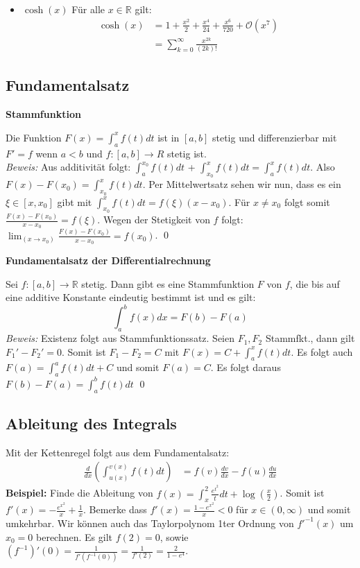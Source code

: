 \documentclass[25pt]{sciposter}
\newcommand{\R}{\mathbb{R}}
\newenvironment{method}[1]{\begin{mdframed}[backgroundcolor=blue!10,innertopmargin=15pt, innerbottommargin=15pt, nobreak=true]
		\textbf{#1 }
	}
	{ 
	\end{mdframed}
}
\begin{document}
\begin{multicols}{3}
\begin{itemize}
	\item $\boxed{\cosh(x)}$ Für alle $x\in \R$ gilt:
	\begin{align*}
	\cosh(x) &= 1 + \frac{x^2}{2} + \frac{x^4}{24} + \frac{x^6}{720} +  \mathcal{O}(x^7)\\
	&= \sum_{k=0}^{\infty}\frac{x^{2k}}{(2k)!}
	\end{align*}
	

\end{itemize}






\subsection*{Fundamentalsatz}
\begin{method}{Stammfunktion}
Die Funktion $F(x) = \int_{a}^{x} f(t) dt$ ist in $[a,b]$ stetig und differenzierbar mit $F' = f$ wenn $a<b$ und $f:[a,b]\to R$ stetig ist. \\
\textit{Beweis:} Aus additivität folgt: $\int_{a}^{x_0} f(t) dt$ + $\int_{x_0}^{x} f(t) dt = \int_{a}^{x} f(t) dt$. Also $F(x) - F(x_0) = \int_{x_0}^{x} f(t) dt$. Per Mittelwertsatz sehen wir nun, dass es ein $\xi \in [x,x_0]$ gibt mit $\int_{x_0}^{x} f(t) dt = f(\xi) (x-x_0) $. Für $x \not = x_0$ folgt somit $\frac{F(x) - F(x_0)}{x-x_0} = f(\xi)$. Wegen der Stetigkeit von $f$ folgt: $\lim_{(x\to x_0)} \frac{F(x) - F(x_0)}{x-x_0} = f(x_0)$. \qed
\end{method}


\begin{method}{Fundamentalsatz der Differentialrechnung}
Sei $f:[a,b] \to \R$ stetig. Dann gibt es eine Stammfunktion $F$ von $f$, die bis auf eine additive Konstante eindeutig bestimmt ist und es gilt:
$$\int_{a}^{b} f(x) dx = F(b) - F(a)$$
\textit{Beweis:} Existenz folgt aus Stammfunktionssatz. Seien $F_1, F_2$ Stammfkt., dann gilt $F_1' - F_2' = 0$. Somit ist $F_1 - F_2 = C$ mit $F(x) = C + \int_{a}^{x} f(t) dt$. Es folgt auch $F(a) = \int_{a}^{a} f(t) dt + C$ und somit $F(a) = C$. Es folgt daraus $F(b)-F(a) = \int_{a}^{b} f(t) dt$ \qed 
\end{method}


\subsection*{Ableitung des Integrals}
Mit der Kettenregel folgt aus dem Fundamentalsatz:
\begin{align*}
\frac{d}{dx} \left( \int_{u(x)}^{v(x)} f(t)  dt \right) &= f(v)\frac{dv}{dx} - f(u)\frac{du}{dx}
\end{align*}
\textbf{Beispiel:} Finde die Ableitung von $f(x) = \int_{x}^{2} \frac{e^{t^2}}{t} dt + \log(\frac{x}{2})$. Somit ist $f'(x) = -\frac{e^{x^2}}{x} + \frac{1}{x}$. Bemerke dass $f'(x) = \frac{1-e^{x^2}}{x}<0$ für $x \in (0, \infty)$ und somit umkehrbar.
Wir können auch das Taylorpolynom 1ter Ordnung von $f'^{-1}(x)$ um $x_0 = 0$ berechnen. Es gilt $f(2) = 0$, sowie $(f^{-1})'(0) = \frac{1}{f'(f^{-1}(0))} = \frac{1}{f'(2)} = \frac{2}{1-e^4}$.


\end{multicols}
\end{document}
